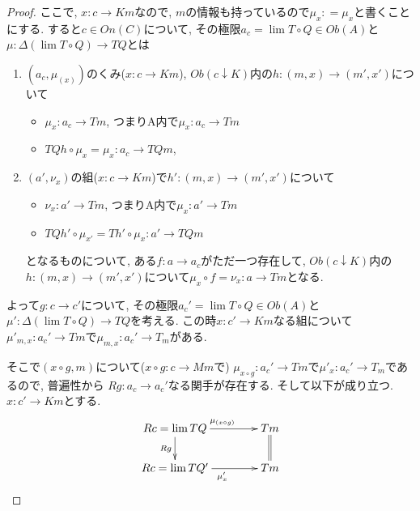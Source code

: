\documentclass[dvipdfmx,a4paper,11pt]{report}
\theoremstyle{definition}
\begin{document}
\begin{proof}
ここで, $x : c \to Km$なので, $m$の情報も持っているので$\mu_{x} : = \mu_x$と書くことにする. 
すると$c \in On(C)$について, その極限$a_c =\lim T\circ Q \in Ob(A)$と$\mu: \Delta (\lim T\circ Q) \to TQ$とは
\begin{enumerate}
\item $(a_c , \mu_{(x)})$のくみ($x : c \to Km $), $Ob(c \downarrow K )$内の$h : (m,x)\to (m',x')$について
\begin{itemize}
\item $\mu_{x} : a_c \to Tm  $, つまりA内で$\mu_{x} :  a_c  \to Tm $
\item $ TQ h  \circ \mu_{x} = \mu_{x} :a_c \to  TQm $, 
\end{itemize}
\item $(a' , \nu_{x})$の組($x : c \to Km $)で$h' : (m,x)\to (m',x')$について
\begin{itemize}
\item $\nu_{x} : a' \to Tm $, つまりA内で$\mu_{x} : a' \to Tm $
\item $  TQ h' \circ \mu_{x'}=Th' \circ \mu_{x}  :a '  \to  TQm$
\end{itemize}
となるものについて, ある$f : a \to a_c$がただ一つ存在して,  $Ob(c \downarrow K )$内の$h : (m,x)\to (m',x')$について$\mu_{x} \circ f = \nu_{x}: a \to Tm$となる.
\end{enumerate}

よって$g : c \to c'$について, 
 その極限$a_c' =\lim T\circ Q \in Ob(A)$と$\mu': \Delta (\lim T\circ Q) \to TQ$を考える.
 この時$x : c' \to Km $なる組について$\mu'_{m,x} : a_c' \to Tm$で$\mu_{m,x} : a_c' \to T_m $がある.
 
 そこで$(x \circ g , m)$について($x \circ g : c \to Mm$で)
 $\mu_{x\circ g} : a_c' \to Tm$で$\mu'_{x} : a_c' \to T_m $であるので, 
 普遍性から
 $Rg : a_c \to a_c'$なる関手が存在する. 
 そして以下が成り立つ. $x : c'\to Km$とする. 
\begin{equation*}
\xymatrix@C=40pt@R=20pt{
Rc = \lim TQ  \ar@{->}[d]_{Rg}  \ar@{->}[r]^{\mu_{(x\circ g)}} & Tm\ar@{=}[d] \\
Rc = \lim TQ' \ar@{->}[r]_{\mu'_{x}} &Tm \\   
}
\end{equation*}


\end{proof}
\end{document}
